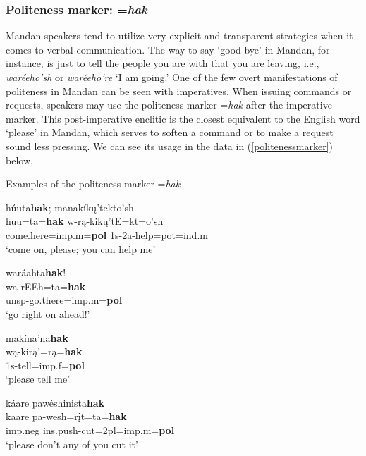 \subsubsection{Politeness marker: =\textit{hak}}\label{SubSecPolitenessMarker}

Mandan speakers tend to utilize very explicit and transparent strategies when it comes to verbal communication. The way to say `good-bye' in Mandan, for instance, is just to tell the people you are with that you are leaving, i.e., \textit{waréeho'sh} or \textit{waréeho're} `I am going.' One of the few overt manifestations of politeness in Mandan can be seen with imperatives. When issuing commands or requests, speakers may use the politeness marker =\textit{hak} after the imperative marker. This post-imperative enclitic is the closest equivalent to the English word `please' in Mandan, which serves to soften a command or to make a request sound less pressing. We can see its usage in the data in (\ref{politenessmarker}) below.

\begin{exe}

\item\label{politenessmarker} Examples of the politeness marker =\textit{hak}

	\begin{xlist}
	
	\item\label{politenessmarker1}
	\glll  húuta\textbf{hak}; manakíkų'tekto'sh\\
	huu=ta=\textbf{hak} w-rą-kikų'tE=kt=o'sh\\
	\textnormal{come.here}=imp.m=\textbf{pol} 1s-2a-\textnormal{help}=pot=ind.m\\
	\glt `come on, please; you can help me' \citep[41]{hollow1973a}

	\item\label{politenessmarker2}
	\glll waráahta\textbf{hak}!\\
	wa-rEEh=ta=\textbf{hak}\\
	unsp-\textnormal{go.there}=imp.m=\textbf{pol}\\
	\glt `go right on ahead!' \citep[265]{hollow1973b}

	\item\label{politenessmarker3}
	\glll makína'na\textbf{hak}\\
	wą-kirą'=rą=\textbf{hak}\\
	1s-\textnormal{tell}=imp.f=\textbf{pol}\\
	\glt `please tell me' \citep[436]{hollow1970}

	\item\label{politenessmarker4}
	\glll káare pawéshinista\textbf{hak}\\
	kaare pa-wesh=rįt=ta=\textbf{hak}\\
	imp.neg ins.push-\textnormal{cut}=2pl=imp.m=\textbf{pol}\\
	\glt `please don't any of you cut it' \citep[436]{hollow1970}
	
	\end{xlist}

\end{exe}

